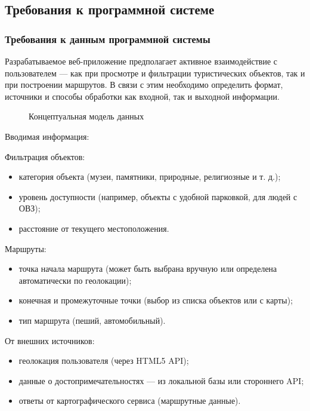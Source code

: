 \subsection{Требования к программной системе}
\subsubsection{Требования к данным программной системы}

Разрабатываемое веб-приложение предполагает активное взаимодействие с пользователем — как при просмотре и фильтрации туристических объектов, так и при построении маршрутов. В связи с этим необходимо определить формат\cite{b4}, источники и способы обработки как входной, так и выходной информации.

\begin{figure}[ht]
	\caption{Концептуальная модель данных}
	\label{comp:image}
\end{figure}

Вводимая информация:

Фильтрация объектов:
\begin{itemize}
	\item категория объекта (музеи, памятники, природные, религиозные и т. д.);
	\item уровень доступности (например, объекты с удобной парковкой, для людей с ОВЗ);
	\item расстояние от текущего местоположения.
\end{itemize}

Маршруты:
\begin{itemize}
	\item точка начала маршрута (может быть выбрана вручную или определена автоматически по геолокации);
	\item конечная и промежуточные точки (выбор из списка объектов или с карты);
	\item тип маршрута (пеший, автомобильный).
\end{itemize}

От внешних источников:
\begin{itemize}
	\item геолокация пользователя (через HTML5 API)\cite{b5};
	\item данные о достопримечательностях — из локальной базы или стороннего API;
	\item ответы от картографического сервиса (маршрутные данные).
\end{itemize}

